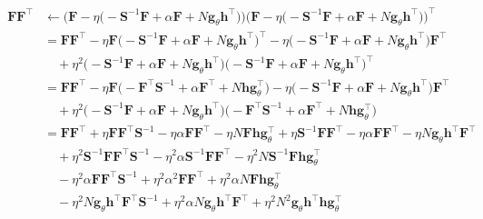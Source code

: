 \documentclass[msc,deptreport.inf]{infthesis} %
\newcommand{\matr}[1]{\mathbf{#1}}
\begin{document}
\begin{align}
\begin{split}
	\matr{F}\matr{F}^\intercal
	& \leftarrow \Big(\matr{F} - \eta \big(-\matr{S}^{-1} \matr{F} + \alpha \matr{F} + N \matr{g}_\theta \matr{h}^\intercal \big)\Big) \Big(\matr{F} - \eta \big(-\matr{S}^{-1} \matr{F} + \alpha \matr{F} + N \matr{g}_\theta \matr{h}^\intercal \big)\Big)^\intercal \\
	& = \matr{F}\matr{F}^\intercal 
	- \eta \matr{F} \big(-\matr{S}^{-1} \matr{F} + \alpha \matr{F} + N \matr{g}_\theta \matr{h}^\intercal \big)^\intercal
	- \eta \big(-\matr{S}^{-1} \matr{F} + \alpha \matr{F} + N \matr{g}_\theta \matr{h}^\intercal \big) \matr{F}^\intercal \\
	& \quad + \eta^2 \big(-\matr{S}^{-1} \matr{F} + \alpha \matr{F} + N \matr{g}_\theta \matr{h}^\intercal \big) \big(-\matr{S}^{-1} \matr{F} + \alpha \matr{F} + N \matr{g}_\theta \matr{h}^\intercal \big)^\intercal \\
	& = \matr{F}\matr{F}^\intercal 
	- \eta \matr{F} \big(-\matr{F}^\intercal \matr{S}^{-1} + \alpha \matr{F}^\intercal + N \matr{h} \matr{g}_\theta^\intercal \big)
	- \eta \big(-\matr{S}^{-1} \matr{F} + \alpha \matr{F} + N \matr{g}_\theta \matr{h}^\intercal \big) \matr{F}^\intercal \\
	& \quad + \eta^2 \big(-\matr{S}^{-1} \matr{F} + \alpha \matr{F} + N \matr{g}_\theta \matr{h}^\intercal \big) \big(-\matr{F}^\intercal \matr{S}^{-1} + \alpha \matr{F}^\intercal + N \matr{h} \matr{g}_\theta^\intercal \big) \\
	& = \matr{F}\matr{F}^\intercal  
	+ \eta \matr{F} \matr{F}^\intercal \matr{S}^{-1} - \eta \alpha \matr{F} \matr{F}^\intercal - \eta N \matr{F} \matr{h} \matr{g}_\theta^\intercal
	+ \eta \matr{S}^{-1} \matr{F} \matr{F}^\intercal - \eta \alpha \matr{F} \matr{F}^\intercal - \eta N \matr{g}_\theta \matr{h}^\intercal \matr{F}^\intercal \\
	& \quad + \eta^2 \matr{S}^{-1} \matr{F} \matr{F}^\intercal \matr{S}^{-1} - \eta^2 \alpha \matr{S}^{-1} \matr{F} \matr{F}^\intercal - \eta^2 N \matr{S}^{-1} \matr{F} \matr{h} \matr{g}_\theta^\intercal \\
	& \quad - \eta^2 \alpha \matr{F} \matr{F}^\intercal \matr{S}^{-1} + \eta^2 \alpha^2 \matr{F} \matr{F}^\intercal + \eta^2 \alpha N \matr{F} \matr{h} \matr{g}_\theta^\intercal \\
	& \quad - \eta^2 N \matr{g}_\theta \matr{h}^\intercal \matr{F}^\intercal \matr{S}^{-1} + \eta^2 \alpha N \matr{g}_\theta \matr{h}^\intercal \matr{F}^\intercal + \eta^2 N^2 \matr{g}_\theta \matr{h}^\intercal \matr{h} \matr{g}_\theta^\intercal \\

\end{split}
\end{align}
\end{document}
